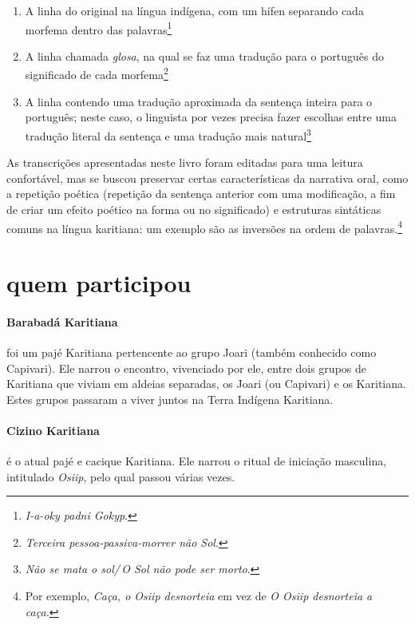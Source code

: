 \begin{enumerate}
\item A linha do original na língua indígena, com um hífen
separando cada morfema dentro das palavras\footnote{\textit{I-a-oky padni Gokyp}.}

\item A linha chamada
\textit{glosa}, na qual se faz uma tradução para o português do
significado de cada morfema\footnote{\textit{Terceira pessoa-passiva-morrer não Sol}.}

\item A linha contendo uma tradução
aproximada da sentença inteira para o português; neste caso, o linguista
por vezes precisa fazer escolhas entre uma tradução literal da sentença
e uma tradução mais natural\footnote{\textit{Não se mata o sol/\,O Sol não pode ser morto}.}

\end{enumerate}

As transcrições apresentadas neste livro foram editadas para uma leitura
confortável, mas se buscou preservar certas características da narrativa
oral, como a repetição poética (repetição da sentença anterior com uma
modificação, a fim de criar um efeito poético na forma ou no
significado) e estruturas sintáticas comuns na língua karitiana: um
exemplo são as inversões na ordem de palavras.\footnote{Por exemplo, \textit{Caça, o
Osiip desnorteia} em vez de \textit{O Osiip desnorteia a caça.}}

\section{quem participou}

\paragraph{Barabadá Karitiana} foi um pajé Karitiana pertencente ao grupo Joari
 (também conhecido como Capivari). Ele narrou o encontro, vivenciado por
 ele, entre dois grupos de Karitiana que viviam em aldeias separadas, os
 Joari (ou Capivari) e os Karitiana. Estes grupos passaram a viver juntos
 na Terra Indígena Karitiana.

 \paragraph{Cizino Karitiana} é o atual pajé e cacique Karitiana. Ele narrou o ritual
 de iniciação masculina, intitulado \textit{Osiip}, pelo qual passou várias
 vezes.

